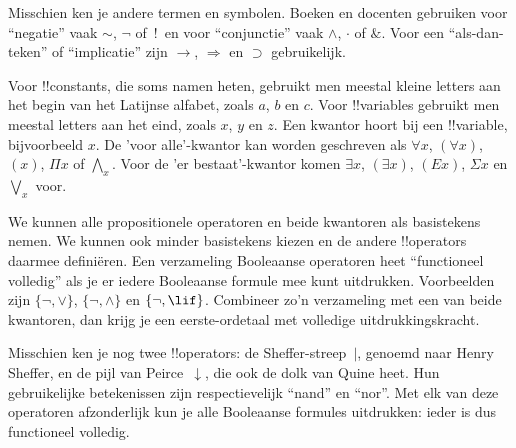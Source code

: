 \documentclass[../../../include/open-logic-section]{subfiles}
\begin{document}

\begin{intro}
Misschien ken je andere termen en symbolen. Boeken en docenten
gebruiken voor ``negatie'' vaak $\sim$, $\neg$ of~!\ en voor
``conjunctie'' vaak $\wedge$, $\cdot$ of $\&$. Voor een ``als-dan-teken''
of ``implicatie'' zijn $\rightarrow$, $\Rightarrow$ en $\supset$
gebruikelijk.

Voor !!{constant}s, die soms namen heten, gebruikt men meestal kleine
letters aan het begin van het Latijnse alfabet, zoals $a$, $b$ en $c$.
Voor !!{variable}s gebruikt men meestal letters aan het eind, zoals
$x$, $y$ en $z$. Een kwantor hoort bij een !!{variable}, bijvoorbeeld
$x$. De 'voor alle'-kwantor kan worden geschreven als $\forall x$,
$(\forall x)$, $(x)$, $\Pi x$ of $\bigwedge_x$. Voor de 'er
bestaat'-kwantor komen $\exists x$, $(\exists x)$, $(Ex)$, $\Sigma x$
en $\bigvee_x$ voor.
\end{intro}

\begin{explain}
We kunnen alle propositionele operatoren en beide kwantoren als
basistekens nemen. We kunnen ook minder basistekens kiezen en de andere
!!{operator}s daarmee definiëren. Een verzameling Booleaanse operatoren
heet ``functioneel volledig'' als je er iedere Booleaanse formule mee
kunt uitdrukken. Voorbeelden zijn $\{ \lnot, \lor \}$,
$\{ \lnot, \land \}$ en $\{ \lnot, \lif\}$. Combineer zo'n verzameling
met een van beide kwantoren, dan krijg je een eerste-ordetaal met
volledige uitdrukkingskracht.

Misschien ken je nog twee !!{operator}s: de Sheffer-streep~$|$, genoemd
naar Henry Sheffer, en de pijl van Peirce~$\downarrow$, die ook de dolk
van Quine heet. Hun gebruikelijke betekenissen zijn respectievelijk
``nand'' en ``nor''. Met elk van deze operatoren afzonderlijk kun je
alle Booleaanse formules uitdrukken: ieder is dus functioneel volledig.
\end{explain}
\end{document}
